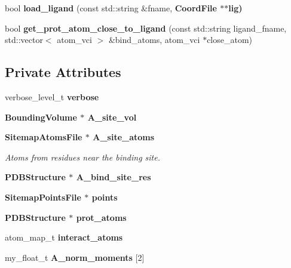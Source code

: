 \begin{CompactItemize}
\item 
bool \textbf{load\_\-ligand} (const std::string \&fname, \bf{Coord\-File} $\ast$$\ast$lig)\label{classASCbase_1_1Sitemap_4c1be8761d14961907869cd902292581}

\item 
bool \textbf{get\_\-prot\_\-atom\_\-close\_\-to\_\-ligand} (const std::string ligand\_\-fname, std::vector$<$ atom\_\-vci $>$ \&bind\_\-atoms, atom\_\-vci $\ast$close\_\-atom)\label{classASCbase_1_1Sitemap_d896226d048c6c0f9347bee48b938f86}

\end{CompactItemize}
\subsection*{Private Attributes}
\begin{CompactItemize}
\item 
verbose\_\-level\_\-t \textbf{verbose}\label{classASCbase_1_1Sitemap_b030f50473b6d8670e571d51003f424d}

\item 
\bf{Bounding\-Volume} $\ast$ \textbf{A\_\-site\_\-vol}\label{classASCbase_1_1Sitemap_6990d012cf2b73d02b1a953df6bea5b9}

\item 
\bf{Sitemap\-Atoms\-File} $\ast$ \bf{A\_\-site\_\-atoms}\label{classASCbase_1_1Sitemap_aacf141914798bdd7861687e432628f8}

\begin{CompactList}\small\item\em Atoms from residues near the binding site. \item\end{CompactList}\item 
\bf{PDBStructure} $\ast$ \textbf{A\_\-bind\_\-site\_\-res}\label{classASCbase_1_1Sitemap_2a52e689037b97d6a36e93507c7883ea}

\item 
\bf{Sitemap\-Points\-File} $\ast$ \textbf{points}\label{classASCbase_1_1Sitemap_0d487acfbafbcd354984bc9ee12d4f18}

\item 
\bf{PDBStructure} $\ast$ \textbf{prot\_\-atoms}\label{classASCbase_1_1Sitemap_d14802c86d41cb3aebbad567ab57cde0}

\item 
atom\_\-map\_\-t \textbf{interact\_\-atoms}\label{classASCbase_1_1Sitemap_104c9c8b0dc2d1c8239e24ff9ae16d30}

\item 
my\_\-float\_\-t \textbf{A\_\-norm\_\-moments} [2]\label{classASCbase_1_1Sitemap_3b31d195203a3e0b86a9b4e42f29aefe}


\end{CompactItemize}

